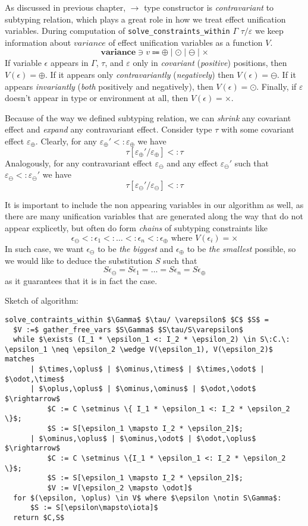 \documentclass[declaration,shortabstract]{iithesis}
\begin{document}
As discussed in previous chapter, $\rightarrow$ type constructor is \textit{contravariant} to subtyping relation, which plays a great role in how we treat effect unification variables.
During computation of \texttt{solve\_constraints\_within} $\Gamma$ $\tau/\varepsilon$ we keep information about $variance$ of effect unification variables as a function $V$.
$$\textbf{variance} \ni v \Coloneqq \oplus \mid \odot \mid \ominus \mid \times$$
If variable $\epsilon$ appears in $\Gamma$, $\tau$, and $\varepsilon$ only in \textit{covariant} (\textit{positive}) positions, then $V(\epsilon) = \oplus$.
If it appears only \textit{contravariantly} (\textit{negatively}) then $V(\epsilon) = \ominus$. If it appears \textit{invariantly} (\textit{both} positively and negatively), then $V(\epsilon) = \odot$. Finally, if $\varepsilon$ doesn't appear in type or environment at all, then $V(\epsilon) = \times$.

Because of the way we defined subtyping relation, we can \textit{shrink} any covariant effect and \textit{expand} any contravariant effect.
Consider type $\tau$ with some covariant effect $\varepsilon_\oplus$.
Clearly, for any $\varepsilon_\oplus' <: \varepsilon_\oplus$ we have
$$ \tau[\varepsilon_\oplus' / \varepsilon_\oplus] <: \tau $$
Analogously, for any contravariant effect $\varepsilon_\ominus$ and 
any effect $\varepsilon_\ominus'$ such that $\varepsilon_\ominus <: \varepsilon_\ominus'$
we have
$$ \tau[\varepsilon_\ominus' / \varepsilon_\ominus] <: \tau$$

It is important to include the non appearing variables in our algorithm as well, as there are many unification variables that are generated along the way that do not appear explicetly, but often do form \textit{chains} of subtyping constraints like
$$\epsilon_\ominus <: \epsilon_1 <: \dots <: \epsilon_n <: \epsilon_\oplus \text{ where } V(\epsilon_i) = \times$$
In such case, we want $\epsilon_\ominus$ to be \textit{the biggest} and $\epsilon_\oplus$ to be \textit{the smallest} possible, so we would like to deduce the substitution $S$ such that
$$S\epsilon_\ominus = S\epsilon_1 = \dots = S\epsilon_n = S\epsilon_\oplus$$
as it guarantees that it is in fact the case.

Sketch of algorithm:

\begin{lstlisting}
solve_contraints_within $\Gamma$ $\tau/ \varepsilon$ $C$ $S$ =
  $V :=$ gather_free_vars $S\Gamma$ $S\tau/S\varepsilon$
  while $\exists (I_1 * \epsilon_1 <: I_2 * \epsilon_2) \in S\:C.\: \epsilon_1 \neq \epsilon_2 \wedge V(\epsilon_1), V(\epsilon_2)$ matches
      | $\times,\oplus$ | $\ominus,\times$ | $\times,\odot$ | $\odot,\times$
      | $\oplus,\oplus$ | $\ominus,\ominus$ | $\odot,\odot$ $\rightarrow$
          $C := C \setminus \{ I_1 * \epsilon_1 <: I_2 * \epsilon_2 \}$;
          $S := S[\epsilon_1 \mapsto I_2 * \epsilon_2]$;
      | $\ominus,\oplus$ | $\ominus,\odot$ | $\odot,\oplus$ $\rightarrow$
          $C := C \setminus \{I_1 * \epsilon_1 <: I_2 * \epsilon_2 \}$;
          $S := S[\epsilon_1 \mapsto I_2 * \epsilon_2]$;
          $V := V[\epsilon_2 \mapsto \odot]$
  for $(\epsilon, \oplus) \in V$ where $\epsilon \notin S\Gamma$:
      $S := S[\epsilon\mapsto\iota]$
  return $C,S$
\end{lstlisting}
\end{document}
